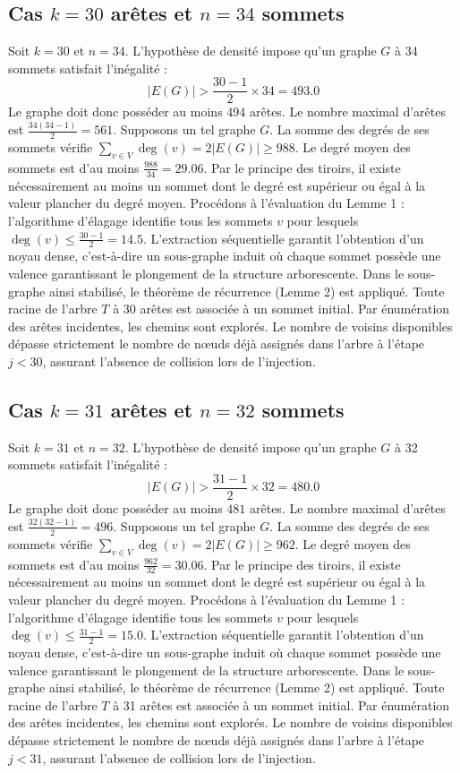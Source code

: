 \documentclass[12pt,a4paper]{article}
\begin{document}
\subsection{Cas $k = 30$ arêtes et $n = 34$ sommets}
Soit $k = 30$ et $n = 34$. L'hypothèse de densité impose qu'un graphe $G$ à 34 sommets satisfait l'inégalité :
$$ |E(G)| > \frac{30-1}{2} \times 34 = 493.0 $$
Le graphe doit donc posséder au moins $494$ arêtes. Le nombre maximal d'arêtes est $\frac{34(34-1)}{2} = 561$.
Supposons un tel graphe $G$. La somme des degrés de ses sommets vérifie $\sum_{v \in V} \deg(v) = 2|E(G)| \geq 988$.
Le degré moyen des sommets est d'au moins $\frac{988}{34} = 29.06$.
Par le principe des tiroirs, il existe nécessairement au moins un sommet dont le degré est supérieur ou égal à la valeur plancher du degré moyen.
Procédons à l'évaluation du Lemme 1 : l'algorithme d'élagage identifie tous les sommets $v$ pour lesquels $\deg(v) \leq \frac{30-1}{2} = 14.5$.
L'extraction séquentielle garantit l'obtention d'un noyau dense, c'est-à-dire un sous-graphe induit où chaque sommet possède une valence garantissant le plongement de la structure arborescente.
Dans le sous-graphe ainsi stabilisé, le théorème de récurrence (Lemme 2) est appliqué. Toute racine de l'arbre $T$ à 30 arêtes est associée à un sommet initial. Par énumération des arêtes incidentes, les chemins sont explorés. Le nombre de voisins disponibles dépasse strictement le nombre de nœuds déjà assignés dans l'arbre à l'étape $j < 30$, assurant l'absence de collision lors de l'injection.

\subsection{Cas $k = 31$ arêtes et $n = 32$ sommets}
Soit $k = 31$ et $n = 32$. L'hypothèse de densité impose qu'un graphe $G$ à 32 sommets satisfait l'inégalité :
$$ |E(G)| > \frac{31-1}{2} \times 32 = 480.0 $$
Le graphe doit donc posséder au moins $481$ arêtes. Le nombre maximal d'arêtes est $\frac{32(32-1)}{2} = 496$.
Supposons un tel graphe $G$. La somme des degrés de ses sommets vérifie $\sum_{v \in V} \deg(v) = 2|E(G)| \geq 962$.
Le degré moyen des sommets est d'au moins $\frac{962}{32} = 30.06$.
Par le principe des tiroirs, il existe nécessairement au moins un sommet dont le degré est supérieur ou égal à la valeur plancher du degré moyen.
Procédons à l'évaluation du Lemme 1 : l'algorithme d'élagage identifie tous les sommets $v$ pour lesquels $\deg(v) \leq \frac{31-1}{2} = 15.0$.
L'extraction séquentielle garantit l'obtention d'un noyau dense, c'est-à-dire un sous-graphe induit où chaque sommet possède une valence garantissant le plongement de la structure arborescente.
Dans le sous-graphe ainsi stabilisé, le théorème de récurrence (Lemme 2) est appliqué. Toute racine de l'arbre $T$ à 31 arêtes est associée à un sommet initial. Par énumération des arêtes incidentes, les chemins sont explorés. Le nombre de voisins disponibles dépasse strictement le nombre de nœuds déjà assignés dans l'arbre à l'étape $j < 31$, assurant l'absence de collision lors de l'injection.
\end{document}
